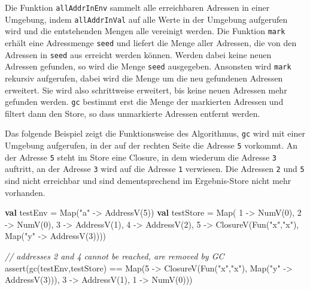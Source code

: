 \documentclass[]{article}
\newenvironment{Shaded}{}{}
\newcommand{\CommentTok}[1]{\textcolor[rgb]{0.38,0.63,0.69}{\textit{#1}}}
\newcommand{\DecValTok}[1]{\textcolor[rgb]{0.25,0.63,0.44}{#1}}
\newcommand{\FunctionTok}[1]{\textcolor[rgb]{0.02,0.16,0.49}{#1}}
\newcommand{\KeywordTok}[1]{\textcolor[rgb]{0.00,0.44,0.13}{\textbf{#1}}}
\newcommand{\NormalTok}[1]{#1}
\newcommand{\StringTok}[1]{\textcolor[rgb]{0.25,0.44,0.63}{#1}}
\begin{document}
Die Funktion \texttt{allAddrInEnv} sammelt alle erreichbaren Adressen in
einer Umgebung, indem \texttt{allAddrInVal} auf alle Werte in der
Umgebung aufgerufen wird und die entstehenden Mengen alle vereinigt
werden. Die Funktion \texttt{mark} erhält eine Adressmenge \texttt{seed}
und liefert die Menge aller Adressen, die von den Adressen in
\texttt{seed} aus erreicht werden können. Werden dabei keine neuen
Adressen gefunden, so wird die Menge \texttt{seed} ausgegeben. Ansonsten
wird \texttt{mark} rekursiv aufgerufen, dabei wird die Menge um die neu
gefundenen Adressen erweitert. Sie wird also schrittweise erweitert, bis
keine neuen Adressen mehr gefunden werden. \texttt{gc} bestimmt erst die
Menge der markierten Adressen und filtert dann den Store, so dass
unmarkierte Adressen entfernt werden.

Das folgende Beispiel zeigt die Funktionsweise des Algorithmus,
\texttt{gc} wird mit einer Umgebung aufgerufen, in der auf der rechten
Seite die Adresse \texttt{5} vorkommt. An der Adresse \texttt{5} steht
im Store eine Closure, in dem wiederum die Adresse \texttt{3} auftritt,
an der Adresse \texttt{3} wird auf die Adresse \texttt{1} verwiesen. Die
Adressen \texttt{2} und \texttt{5} sind nicht erreichbar und sind
dementsprechend im Ergebnis-Store nicht mehr vorhanden.

\begin{Shaded}
\begin{Highlighting}[]
\KeywordTok{val}\NormalTok{ testEnv = Map(}\StringTok{"a"}\NormalTok{ {-}\textgreater{} }\FunctionTok{AddressV}\NormalTok{(}\DecValTok{5}\NormalTok{))}
\KeywordTok{val}\NormalTok{ testStore = Map(}
  \DecValTok{1}\NormalTok{ {-}\textgreater{} }\FunctionTok{NumV}\NormalTok{(}\DecValTok{0}\NormalTok{),}
  \DecValTok{2}\NormalTok{ {-}\textgreater{} }\FunctionTok{NumV}\NormalTok{(}\DecValTok{0}\NormalTok{),}
  \DecValTok{3}\NormalTok{ {-}\textgreater{} }\FunctionTok{AddressV}\NormalTok{(}\DecValTok{1}\NormalTok{),}
  \DecValTok{4}\NormalTok{ {-}\textgreater{} }\FunctionTok{AddressV}\NormalTok{(}\DecValTok{2}\NormalTok{),}
  \DecValTok{5}\NormalTok{ {-}\textgreater{} }\FunctionTok{ClosureV}\NormalTok{(}\FunctionTok{Fun}\NormalTok{(}\StringTok{"x"}\NormalTok{,}\StringTok{"x"}\NormalTok{), Map(}\StringTok{"y"}\NormalTok{ {-}\textgreater{} }\FunctionTok{AddressV}\NormalTok{(}\DecValTok{3}\NormalTok{))))}
  
\CommentTok{// addresses 2 and 4 cannot be reached, are removed by GC}
\FunctionTok{assert}\NormalTok{(}\FunctionTok{gc}\NormalTok{(testEnv,testStore) ==}
\NormalTok{  Map(}\DecValTok{5}\NormalTok{ {-}\textgreater{} }\FunctionTok{ClosureV}\NormalTok{(}\FunctionTok{Fun}\NormalTok{(}\StringTok{"x"}\NormalTok{,}\StringTok{"x"}\NormalTok{), Map(}\StringTok{"y"}\NormalTok{ {-}\textgreater{} }\FunctionTok{AddressV}\NormalTok{(}\DecValTok{3}\NormalTok{))),}
      \DecValTok{3}\NormalTok{ {-}\textgreater{} }\FunctionTok{AddressV}\NormalTok{(}\DecValTok{1}\NormalTok{), }
      \DecValTok{1}\NormalTok{ {-}\textgreater{} }\FunctionTok{NumV}\NormalTok{(}\DecValTok{0}\NormalTok{)))}
\end{Highlighting}
\end{Shaded}
\end{document}
